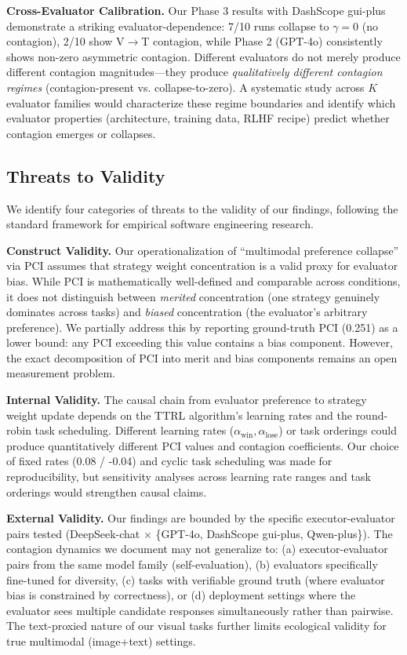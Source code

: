 \documentclass[11pt,a4paper]{article}
\begin{document}
\textbf{Cross-Evaluator Calibration.} Our Phase 3 results with DashScope gui-plus demonstrate a striking evaluator-dependence: 7/10 runs collapse to $\gamma=0$ (no contagion), 2/10 show V$\to$T contagion, while Phase 2 (GPT-4o) consistently shows non-zero asymmetric contagion. Different evaluators do not merely produce different contagion magnitudes---they produce \textit{qualitatively different contagion regimes} (contagion-present vs. collapse-to-zero). A systematic study across $K$ evaluator families would characterize these regime boundaries and identify which evaluator properties (architecture, training data, RLHF recipe) predict whether contagion emerges or collapses.

\subsection{Threats to Validity}

We identify four categories of threats to the validity of our findings, following the standard framework for empirical software engineering research.

\textbf{Construct Validity.} Our operationalization of ``multimodal preference collapse'' via PCI assumes that strategy weight concentration is a valid proxy for evaluator bias. While PCI is mathematically well-defined and comparable across conditions, it does not distinguish between \textit{merited} concentration (one strategy genuinely dominates across tasks) and \textit{biased} concentration (the evaluator's arbitrary preference). We partially address this by reporting ground-truth PCI (0.251) as a lower bound: any PCI exceeding this value contains a bias component. However, the exact decomposition of PCI into merit and bias components remains an open measurement problem.

\textbf{Internal Validity.} The causal chain from evaluator preference to strategy weight update depends on the TTRL algorithm's learning rates and the round-robin task scheduling. Different learning rates ($\alpha_{\text{win}}, \alpha_{\text{lose}}$) or task orderings could produce quantitatively different PCI values and contagion coefficients. Our choice of fixed rates (0.08 / -0.04) and cyclic task scheduling was made for reproducibility, but sensitivity analyses across learning rate ranges and task orderings would strengthen causal claims.

\textbf{External Validity.} Our findings are bounded by the specific executor-evaluator pairs tested (DeepSeek-chat $\times$ \{GPT-4o, DashScope gui-plus, Qwen-plus\}). The contagion dynamics we document may not generalize to: (a) executor-evaluator pairs from the same model family (self-evaluation), (b) evaluators specifically fine-tuned for diversity, (c) tasks with verifiable ground truth (where evaluator bias is constrained by correctness), or (d) deployment settings where the evaluator sees multiple candidate responses simultaneously rather than pairwise. The text-proxied nature of our visual tasks further limits ecological validity for true multimodal (image+text) settings.
\end{document}
